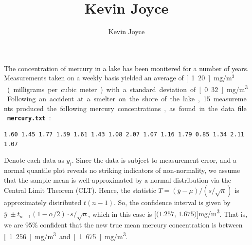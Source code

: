 \documentclass{homework}
\title{Kevin Joyce}
\author{Kevin Joyce}
\begin{document}
 
\newcommand{\figref}[1]{\figurename~\ref{#1}}
\renewcommand{\bar}{\overline}
\renewcommand{\hat}{\widehat}
\renewcommand{\SS}{\mathcal S}
\newcommand{\HH}{\mathscr H}
\newcommand{\mom}{\widetilde}
\newcommand{\mle}{\widehat \Uptheta}
\newcommand{\eps}{\varepsilon}
\newcommand{\todist}{\stackrel{D}\longrightarrow}
\newcommand{\toprob}{\stackrel{p}\longrightarrow}
\newcommand{\TTheta}{\overline{\underline \Theta} }
\newcommand{\del}{\partial}
\newcommand{\approxsim}{\overset{\cdotp}{\underset{\cdotp}{\sim}}}
\begin{longproblem}
  The concentration of mercury in a lake has been monitered for a number of years.  Measurements taken on a weekly basis yielded an average of \unit[1.20]{$\mathrm{mg/m^3}$} (milligrams per cubic meter) with a standard deviation of \unit[0.32]{mg/m\textsuperscript{3}}.  Following an accident at a smelter on the shore of the lake, 15 measurements produced the following mercury concentrations, as found in the data file {\bf \tt mercury.txt}:  
\begin{center}
\begin{verbatim}
1.60 1.45 1.77 1.59 1.61 1.43 1.08 2.07 1.07 1.16 1.79 0.85 1.34 2.11 1.07
\end{verbatim}
\end{center}


\begin{solution}
  Denote each data as $y_i$.  Since the data is subject to measurement error,
  and a normal quantile plot reveals no striking indicators of non-normality,
  we assume that the sample mean is well-approximated by a normal distribution
  via the Central Limit Theorem (CLT).  Hence, the statistic $T = (\bar y -
  \mu)/(s/\sqrt n)$ is approximately distributed $t(n-1)$. So, the confidence interval
  is given by $\bar y_. \pm t_{n-1}(1-\alpha/2)\cdot s/\sqrt n$, which in this case is \unit[$\big(1.257,\,1.675\big)$]{mg/m\textsuperscript3}.
  That is, we are 95\% confident that the new true mean mercury concentration is between \unit[1.256]{mg/m\textsuperscript3} and \unit[1.675]{mg/m\textsuperscript3}.  
\end{solution}



\end{longproblem}
\end{document}
